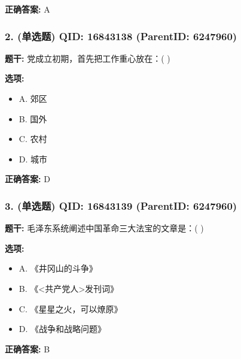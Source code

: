 \documentclass[12pt,UTF8]{ctexart}
\begin{document}
\textbf{正确答案:}
A

\vspace{0.3em}\hrulefill\vspace{0.7em}

\subsubsection*{2. (单选题) \small QID: 16843138 (ParentID: 6247960)}

\textbf{题干:}
党成立初期，首先把工作重心放在：( )



\textbf{选项:}
\begin{itemize}[leftmargin=*]

  \item A. 郊区

  \item B. 国外

  \item C. 农村

  \item D. 城市

\end{itemize}

\textbf{正确答案:}
D

\vspace{0.3em}\hrulefill\vspace{0.7em}

\subsubsection*{3. (单选题) \small QID: 16843139 (ParentID: 6247960)}

\textbf{题干:}
毛泽东系统阐述中国革命三大法宝的文章是：( )



\textbf{选项:}
\begin{itemize}[leftmargin=*]

  \item A. 《井冈山的斗争》

  \item B. 《<共产党人>发刊词》

  \item C. 《星星之火，可以燎原》

  \item D. 《战争和战略问题》

\end{itemize}

\textbf{正确答案:}
B
\end{document}

